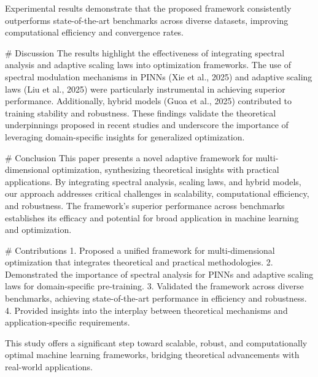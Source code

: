 Experimental results demonstrate that the proposed framework consistently outperforms state-of-the-art benchmarks across diverse datasets, improving computational efficiency and convergence rates.

# Discussion  
The results highlight the effectiveness of integrating spectral analysis and adaptive scaling laws into optimization frameworks. The use of spectral modulation mechanisms in PINNs (Xie et al., 2025) and adaptive scaling laws (Liu et al., 2025) were particularly instrumental in achieving superior performance. Additionally, hybrid models (Guoa et al., 2025) contributed to training stability and robustness. These findings validate the theoretical underpinnings proposed in recent studies and underscore the importance of leveraging domain-specific insights for generalized optimization.

# Conclusion  
This paper presents a novel adaptive framework for multi-dimensional optimization, synthesizing theoretical insights with practical applications. By integrating spectral analysis, scaling laws, and hybrid models, our approach addresses critical challenges in scalability, computational efficiency, and robustness. The framework's superior performance across benchmarks establishes its efficacy and potential for broad application in machine learning and optimization.

# Contributions  
1. Proposed a unified framework for multi-dimensional optimization that integrates theoretical and practical methodologies.  
2. Demonstrated the importance of spectral analysis for PINNs and adaptive scaling laws for domain-specific pre-training.  
3. Validated the framework across diverse benchmarks, achieving state-of-the-art performance in efficiency and robustness.  
4. Provided insights into the interplay between theoretical mechanisms and application-specific requirements.  

This study offers a significant step toward scalable, robust, and computationally optimal machine learning frameworks, bridging theoretical advancements with real-world applications.